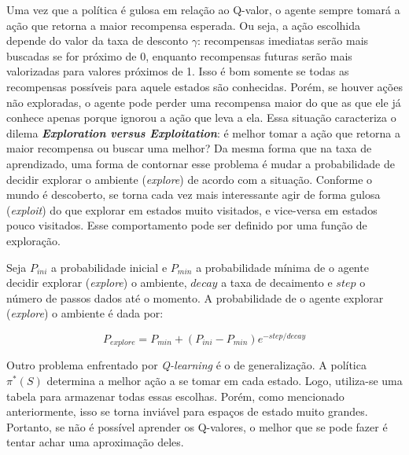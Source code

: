 Uma vez que a política é gulosa em relação ao Q-valor, o agente sempre tomará a ação que retorna a maior recompensa esperada.
Ou seja, a ação escolhida depende do valor da taxa de desconto $\gamma$: recompensas imediatas serão mais buscadas se for próximo de 0, enquanto recompensas futuras serão mais valorizadas para valores próximos de 1.
Isso é bom somente se todas as recompensas possíveis para aquele estados são conhecidas.
Porém, se houver ações não exploradas, o agente pode perder uma recompensa maior do que as que ele já conhece apenas porque ignorou a ação que leva a ela.
Essa situação caracteriza o dilema \textbf{\textit{Exploration versus Exploitation}}: é melhor tomar a ação que retorna a maior recompensa ou buscar uma melhor?
Da mesma forma que na taxa de aprendizado, uma forma de contornar esse problema é mudar a probabilidade de decidir explorar o ambiente (\textit{explore}) de acordo com a situação.
Conforme o mundo é descoberto, se torna cada vez mais interessante agir de forma gulosa (\textit{exploit}) do que explorar em estados muito visitados, e vice-versa em estados pouco visitados.
Esse comportamento pode ser definido por uma função de exploração.

Seja $P_{ini}$ a probabilidade inicial e $P_{min}$ a probabilidade mínima de o agente decidir explorar (\textit{explore}) o ambiente, $decay$ a taxa de decaimento e $step$ o número de passos dados até o momento.
A probabilidade de o agente explorar (\textit{explore}) o ambiente é dada por:

\begin{equation} \label{eq:exp_exp_prob}
P_{explore} = P_{min} + (P_{ini} - P_{min})e^{-step/decay}
\end{equation}

Outro problema enfrentado por \textit{Q-learning} é o de generalização.
A política $\pi^{*}(S)$ determina a melhor ação a se tomar em cada estado.
Logo, utiliza-se uma tabela para armazenar todas essas escolhas.
Porém, como mencionado anteriormente, isso se torna inviável para espaços de estado muito grandes.
Portanto, se não é possível aprender os Q-valores, o melhor que se pode fazer é tentar achar uma aproximação deles.

